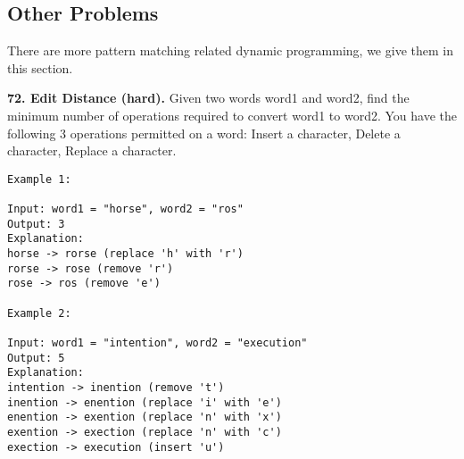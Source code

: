 \documentclass[../main.tex]{subfiles}
\begin{document}
\subsection{Other Problems}
There are more pattern matching related dynamic programming, we give them in this section. 
\begin{examples}[resume]
\item \textbf{72. Edit Distance (hard).}
Given two words word1 and word2, find the minimum number of operations required to convert word1 to word2. You have the following 3 operations permitted on a word: Insert a character, Delete a character, Replace a character.
\begin{lstlisting}[numbers=none]
Example 1:

Input: word1 = "horse", word2 = "ros"
Output: 3
Explanation: 
horse -> rorse (replace 'h' with 'r')
rorse -> rose (remove 'r')
rose -> ros (remove 'e')

Example 2:

Input: word1 = "intention", word2 = "execution"
Output: 5
Explanation: 
intention -> inention (remove 't')
inention -> enention (replace 'i' with 'e')
enention -> exention (replace 'n' with 'x')
exention -> exection (replace 'n' with 'c')
exection -> execution (insert 'u')
\end{lstlisting}


\end{examples}
\end{document}
